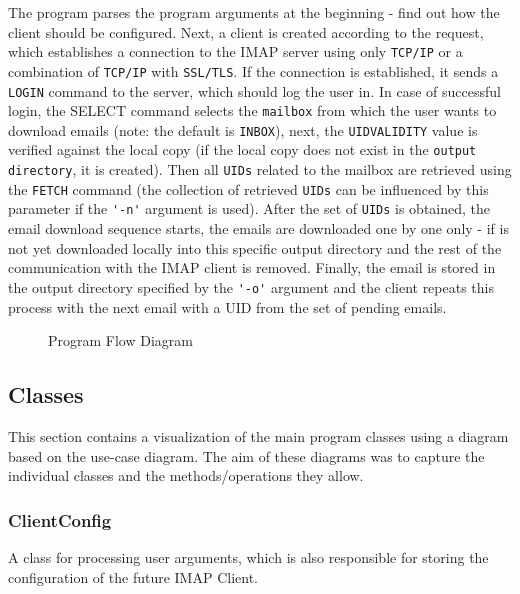 \documentclass[a4paper,11pt]{article}
\begin{document}
The program parses the program arguments at the beginning - find out how the client should be 
configured. Next, a client is created according to the request, which establishes a connection 
to the IMAP server using only \verb!TCP/IP! or a combination of \verb!TCP/IP! with \verb!SSL/TLS!.
If the connection is established, it sends a \verb!LOGIN! command to the server, which should log 
the user in. In case of successful login, the SELECT command selects the \verb!mailbox! from which 
the user wants to download emails (note: the default is \verb!INBOX!), next, the \verb!UIDVALIDITY! 
value is verified against the local copy (if the local copy does not exist in the 
\verb!output directory!, it is created). Then all \verb!UIDs! related to the mailbox are retrieved using 
the \verb!FETCH! command (the collection of retrieved \verb!UIDs! can be influenced by this parameter if the 
\verb!'-n'! argument is used). After the set of \verb!UIDs! is obtained, the email download sequence 
starts, the emails are downloaded one by one only - if is not yet downloaded locally into this specific output directory 
and the rest of the communication with the IMAP client is removed. Finally, the email is stored 
in the output directory specified by the \verb!'-o'! argument and the client repeats this 
process with the next email with a UID from the set of pending emails.

\begin{figure}[H]
    \centering
    \caption{Program Flow Diagram}
    \label{figure:program-flow-diagram}
\end{figure}

\newpage
\subsection{Classes}
This section contains a visualization of the main program classes using a diagram based on 
the use-case diagram. The aim of these diagrams was to capture the individual classes and the 
methods/operations they allow.

\subsubsection{ClientConfig}
A class for processing user arguments, which is also responsible for storing the configuration 
of the future IMAP Client.
\end{document}
